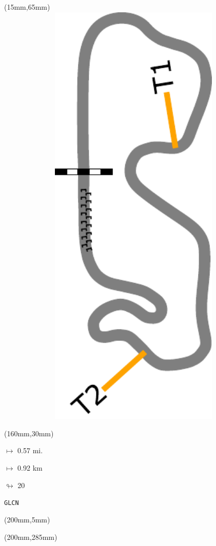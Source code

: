 \begin{textblock*}{185mm}(15mm,65mm)%
\centering
\mbox{\includegraphics[width=185mm,height=210mm,keepaspectratio]{PT/GLCN.pdf}}
\end{textblock*}
\begin{textblock*}{40mm}(160mm,30mm)%
\Large
\par$\mapsto$ 0.57 mi.
\par$\mapsto$ 0.92 km
\par$\looparrowright$ 20
\par\hfill\tiny\tt GLCN\\
\end{textblock*}
\begin{textblock*}{20mm}(200mm,5mm)%
\fbox{\thepage}
\label{GLCN}
\end{textblock*}
\begin{textblock*}{20mm}(200mm,285mm)%
\fbox{\thepage}
\end{textblock*}


